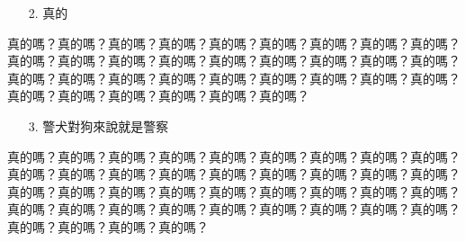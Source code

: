 \begin{itemize}
\item[2.]
真的
\end{itemize}
真的嗎？真的嗎？真的嗎？真的嗎？真的嗎？真的嗎？真的嗎？真的嗎？真的嗎？真的嗎？真的嗎？真的嗎？真的嗎？真的嗎？真的嗎？真的嗎？真的嗎？真的嗎？真的嗎？真的嗎？真的嗎？真的嗎？真的嗎？真的嗎？真的嗎？真的嗎？真的嗎？真的嗎？真的嗎？真的嗎？真的嗎？真的嗎？真的嗎？


\begin{itemize}
\item[3.]
警犬對狗來說就是警察
\end{itemize}


真的嗎？真的嗎？真的嗎？真的嗎？真的嗎？真的嗎？真的嗎？真的嗎？真的嗎？真的嗎？真的嗎？真的嗎？真的嗎？真的嗎？真的嗎？真的嗎？真的嗎？真的嗎？真的嗎？真的嗎？真的嗎？真的嗎？真的嗎？真的嗎？真的嗎？真的嗎？真的嗎？真的嗎？真的嗎？真的嗎？真的嗎？真的嗎？真的嗎？真的嗎？真的嗎？真的嗎？真的嗎？真的嗎？真的嗎？真的嗎？